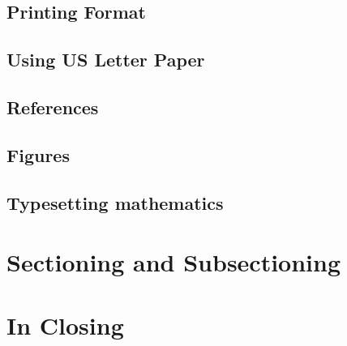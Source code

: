 \subsection{Printing Format}



\subsection{Using US Letter Paper}


\subsection{References}



\subsection{Figures}



\subsection{Typesetting mathematics}







\section{Sectioning and Subsectioning}




\section{In Closing}

